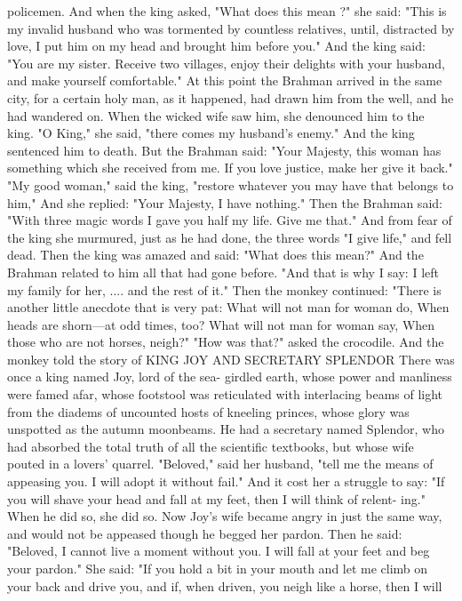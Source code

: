 \documentclass{book}
\begin{document}
policemen. And when the king asked, "What does
this mean ?" she said: "This is my invalid husband
who was tormented by countless relatives, until,
distracted by love, I put him on my head and brought
him before you." And the king said: "You are my
sister. Receive two villages, enjoy their delights
with your husband, and make yourself comfortable."
At this point the Brahman arrived in the same
city, for a certain holy man, as it happened, had
drawn him from the well, and he had wandered on.
When the wicked wife saw him, she denounced him
to the king. "O King," she said, "there comes my
husband's enemy."
And the king sentenced him to death.
But the Brahman said: "Your Majesty, this
woman has something which she received from me.
If you love justice, make her give it back." "My
good woman," said the king, "restore whatever you
may have that belongs to him," And she replied:
"Your Majesty, I have nothing."
Then the Brahman said: "With three magic
words I gave you half my life. Give me that." And
from fear of the king she murmured, just as he had
done, the three words "I give life," and fell dead.
Then the king was amazed and said: "What does
this mean?" And the Brahman related to him all
that had gone before.
"And that is why I say:
I left my family for her, ....
and the rest of it."
Then the monkey continued: "There is another
little anecdote that is very pat:
What will not man for woman do,
When heads are shorn---at odd times, too?
What will not man for woman say,
When those who are not horses, neigh?"
"How was that?" asked the crocodile. And the
monkey told the story of
KING JOY AND SECRETARY SPLENDOR
There was once a king named Joy, lord of the sea-
girdled earth, whose power and manliness were famed
afar, whose footstool was reticulated with interlacing
beams of light from the diadems of uncounted hosts
of kneeling princes, whose glory was unspotted as
the autumn moonbeams. He had a secretary named
Splendor, who had absorbed the total truth of all
the scientific textbooks, but whose wife pouted in a
lovers' quarrel.
"Beloved," said her husband, "tell me the means
of appeasing you. I will adopt it without fail." And
it cost her a struggle to say: "If you will shave your
head and fall at my feet, then I will think of relent-
ing." When he did so, she did so.
Now Joy's wife became angry in just the same
way, and would not be appeased though he begged
her pardon. Then he said: "Beloved, I cannot live a
moment without you. I will fall at your feet and beg
your pardon." She said: "If you hold a bit in your
mouth and let me climb on your back and drive you,
and if, when driven, you neigh like a horse, then I will
\end{document}
